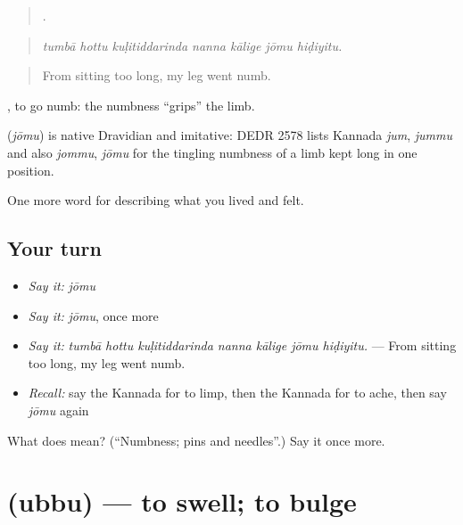 \begin{quote}
      .
\end{quote}

\begin{quote}
\emph{tumbā hottu kuḷitiddarinda nanna kālige jōmu hiḍiyitu.}
\end{quote}

\begin{quote}
From sitting too long, my leg went numb.
\end{quote}

 , to go numb: the numbness \textquotedblleft{}grips\textquotedblright{} the limb.

\begin{cousinweb}
\textbf{} (\emph{jōmu}) is native Dravidian and imitative: DEDR 2578 lists Kannada \emph{jum}, \emph{jummu} and also \emph{jommu}, \emph{jōmu} for the tingling numbness of a limb kept long in one position.
\end{cousinweb}

\begin{grammarlens}[title={What you've built}]
One more word for describing what you lived and felt.
\end{grammarlens}

\subsection*{Your turn}
\begin{itemize}
\raggedright
  \item \emph{Say it:} \emph{jōmu}
  \item \emph{Say it:} \emph{jōmu}, once more
  \item \emph{Say it:} \emph{tumbā hottu kuḷitiddarinda nanna kālige jōmu hiḍiyitu.} — From sitting too long, my leg went numb.
  \item \emph{Recall:} say the Kannada for to limp, then the Kannada for to ache, then say \emph{jōmu} again
\end{itemize}

\begin{tcolorbox}[breakable,colback=teal!4,colframe=teal!35!black,title={Before you move on}]
What does  mean? (\textquotedblleft{}Numbness; pins and needles\textquotedblright{}.) Say it once more.
\end{tcolorbox}
\section[\texorpdfstring{\kn{ಉಬ್ಬು} (ubbu)}{ಉಬ್ಬು (ubbu)}]{ (ubbu) — to swell; to bulge}

